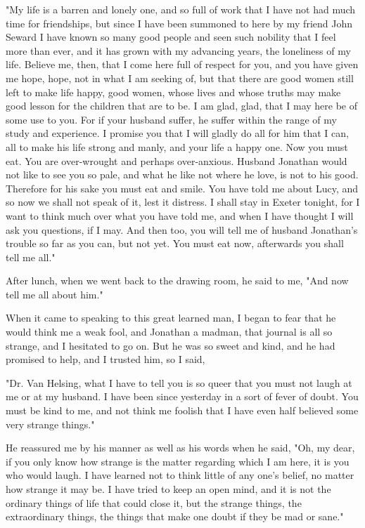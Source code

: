 "My life is a barren and lonely one, and so full of work that I have not had much time for friendships, but since I have been summoned to here by my friend John Seward I have known so many good people and seen such nobility that I feel more than ever, and it has grown with my advancing years, the loneliness of my life. Believe me, then, that I come here full of respect for you, and you have given me hope, hope, not in what I am seeking of, but that there are good women still left to make life happy, good women, whose lives and whose truths may make good lesson for the children that are to be. I am glad, glad, that I may here be of some use to you. For if your husband suffer, he suffer within the range of my study and experience. I promise you that I will gladly do all for him that I can, all to make his life strong and manly, and your life a happy one. Now you must eat. You are over-wrought and perhaps over-anxious. Husband Jonathan would not like to see you so pale, and what he like not where he love, is not to his good. Therefore for his sake you must eat and smile. You have told me about Lucy, and so now we shall not speak of it, lest it distress. I shall stay in Exeter tonight, for I want to think much over what you have told me, and when I have thought I will ask you questions, if I may. And then too, you will tell me of husband Jonathan's trouble so far as you can, but not yet. You must eat now, afterwards you shall tell me all." 

After lunch, when we went back to the drawing room, he said to me, "And now tell me all about him." 

When it came to speaking to this great learned man, I began to fear that he would think me a weak fool, and Jonathan a madman, that journal is all so strange, and I hesitated to go on. But he was so sweet and kind, and he had promised to help, and I trusted him, so I said, 

"Dr. Van Helsing, what I have to tell you is so queer that you must not laugh at me or at my husband. I have been since yesterday in a sort of fever of doubt. You must be kind to me, and not think me foolish that I have even half believed some very strange things." 

He reassured me by his manner as well as his words when he said, "Oh, my dear, if you only know how strange is the matter regarding which I am here, it is you who would laugh. I have learned not to think little of any one's belief, no matter how strange it may be. I have tried to keep an open mind, and it is not the ordinary things of life that could close it, but the strange things, the extraordinary things, the things that make one doubt if they be mad or sane." 

